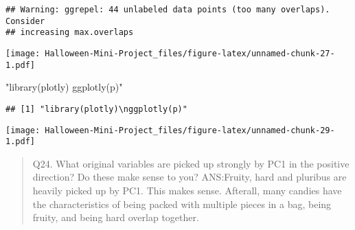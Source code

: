 \documentclass[
]{article}
\newenvironment{Shaded}{\begin{snugshade}}{\end{snugshade}}
\newcommand{\AttributeTok}[1]{\textcolor[rgb]{0.13,0.29,0.53}{#1}}
\newcommand{\DecValTok}[1]{\textcolor[rgb]{0.00,0.00,0.81}{#1}}
\newcommand{\FunctionTok}[1]{\textcolor[rgb]{0.13,0.29,0.53}{\textbf{#1}}}
\newcommand{\NormalTok}[1]{#1}
\newcommand{\SpecialCharTok}[1]{\textcolor[rgb]{0.81,0.36,0.00}{\textbf{#1}}}
\newcommand{\StringTok}[1]{\textcolor[rgb]{0.31,0.60,0.02}{#1}}
\begin{document}
\begin{verbatim}
## Warning: ggrepel: 44 unlabeled data points (too many overlaps). Consider
## increasing max.overlaps
\end{verbatim}

\texttt{[image: Halloween-Mini-Project\_files/figure-latex/unnamed-chunk-27-1.pdf]}

\begin{Shaded}
\begin{Highlighting}[]
\StringTok{"library(plotly)}
\StringTok{ggplotly(p)"}
\end{Highlighting}
\end{Shaded}

\begin{verbatim}
## [1] "library(plotly)\nggplotly(p)"
\end{verbatim}

\begin{Shaded}
\end{Shaded}

\texttt{[image: Halloween-Mini-Project\_files/figure-latex/unnamed-chunk-29-1.pdf]}

\begin{quote}
Q24. What original variables are picked up strongly by PC1 in the
positive direction? Do these make sense to you? ANS:Fruity, hard and
pluribus are heavily picked up by PC1. This makes sense. Afterall, many
candies have the characteristics of being packed with multiple pieces in
a bag, being fruity, and being hard overlap together.
\end{quote}
\end{document}
